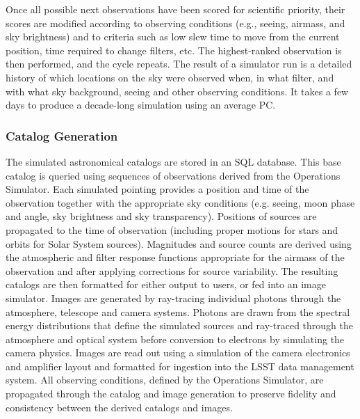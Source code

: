 \documentclass{emulateapj}
\begin{document}
{Once all possible next observations have been scored for scientific
priority, their scores are modified according to observing conditions
(e.g., seeing, airmass, and sky brightness) and to criteria such as
low slew time to move from the current position, time required to
change filters, etc. The highest-ranked observation is then performed,
and the cycle repeats. The result of a simulator run is a detailed
history of which locations on the sky were observed when, in what
filter, and with what sky background, seeing and other observing
conditions.  It takes a few days to produce a decade-long simulation
using an average PC.

\subsubsection{Catalog Generation}
\label{sec:catalogs}

The simulated astronomical catalogs are stored in an SQL
database. This base catalog is queried using sequences of observations
derived from the Operations Simulator. Each simulated
pointing provides a position and time of the observation together with
the appropriate sky conditions (e.g. seeing, moon phase and angle, sky
brightness and sky transparency). Positions of sources are propagated
to the time of observation (including proper motions for stars and
orbits for Solar System sources). Magnitudes and source counts are
derived using the atmospheric and filter response functions
appropriate for the airmass of the observation and after applying
corrections for source variability.  The resulting catalogs are then
formatted for either output to users, or fed into an image
simulator. Images are generated by ray-tracing individual photons
through the atmosphere, telescope and camera systems. Photons are
drawn from the spectral energy distributions that define the simulated
sources and ray-traced through the atmosphere and optical system
before conversion to electrons by simulating the camera physics.
Images are read out using a simulation of the camera electronics and
amplifier layout and formatted for ingestion into the LSST data
management system. All observing conditions, defined by the Operations
Simulator, are propagated through the catalog and image generation to
preserve fidelity and consistency between the derived catalogs and
images.
 
}
\end{document}
